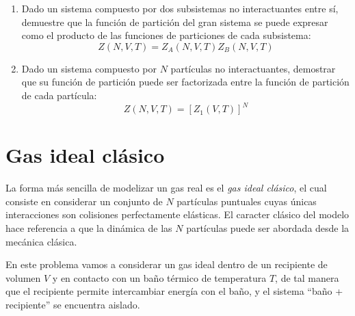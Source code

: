 \documentclass[a4paper,11pt]{article}
\begin{document}
\begin{enumerate}[label=(\alph*),
                  leftmargin=2\parindent,
                  rightmargin=2\parindent]

    \item{Dado un sistema compuesto por dos subsistemas no interactuantes entre sí,
          demuestre que la función de partición del gran sistema se puede expresar
          como el producto de las funciones de particiones de cada subsistema:
          $$ Z(N, V, T) = Z_A(N, V, T) Z_B(N, V, T) $$
          }

    \item{Dado un sistema compuesto por $N$ partículas no interactuantes, demostrar que
          su función de partición puede ser factorizada entre la función de partición
          de cada partícula:
          $$ Z(N, V, T) = [Z_1(V, T)]^N $$
          }

\end{enumerate}


\section{Gas ideal clásico}
\label{sec:gas-ideal}

La forma más sencilla de modelizar un gas real es el \emph{gas ideal
clásico}, el cual consiste en considerar un conjunto de $N$ partículas
puntuales cuyas únicas interacciones son colisiones
perfectamente elásticas.
El caracter clásico del modelo hace referencia a que la dinámica de
las $N$ partículas puede ser abordada desde la mecánica clásica.

En este problema vamos a considerar un gas ideal dentro de un
recipiente de volumen $V$ y en contacto con un baño térmico de
temperatura $T$, de tal manera que el recipiente permite intercambiar
energía con el baño, y el sistema ``baño + recipiente'' se encuentra
aislado.
\end{document}
